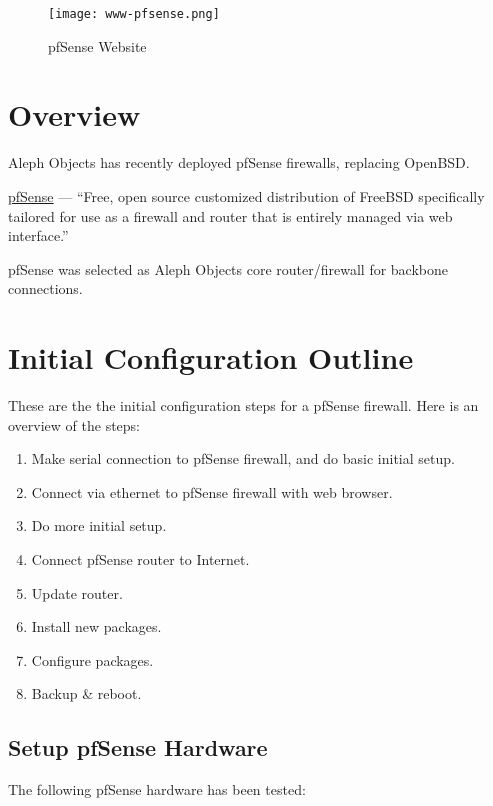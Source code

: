 %
%
%
%
%
\begin{figure}[h!]
\texttt{[image: www-pfsense.png]}
 \caption{pfSense Website}
 \label{fig:www-pfsense}
\end{figure}

\section{Overview}
Aleph Objects has recently deployed pfSense firewalls, replacing OpenBSD.

\href{https://www.pfsense.org/}{pfSense} --- ``Free, open source customized
distribution of FreeBSD specifically tailored for use as a firewall and router
that is entirely managed via web interface.''

pfSense was selected as Aleph Objects core router/firewall for backbone
connections.

\section{Initial Configuration Outline}

These are the the initial configuration steps for a pfSense firewall. Here is an overview of the steps:

\begin{enumerate}
 \item Make serial connection to pfSense firewall, and do basic initial setup.
 \item Connect via ethernet to pfSense firewall with web browser.
 \item Do more initial setup.
 \item Connect pfSense router to Internet.
 \item Update router.
 \item Install new packages.
 \item Configure packages.
 \item Backup \& reboot.
\end{enumerate}


\subsection{Setup pfSense Hardware}
The following pfSense hardware has been tested:


